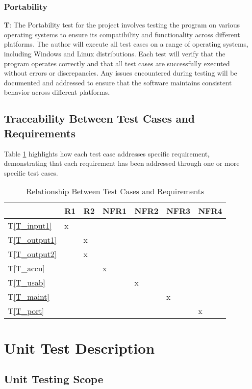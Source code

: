 \documentclass[12pt, titlepage]{article}
\newcounter{testCase}
\newcommand{\testCaseFormat}{T\thetestCase}
\newcommand{\tref}[1]{T\ref{#1}}
\begin{document}
\subsubsection{Portability}\label{subsec:Portability}
 \textbf{\testCaseFormat \label{T_port}}: The Portability test for the project involves testing the program on various operating systems to ensure its compatibility and functionality across different platforms. The author will execute all test cases on a range of operating systems, including Windows and Linux distributions. Each test will verify that the program operates correctly and that all test cases are successfully executed without errors or discrepancies. Any issues encountered during testing will be documented and addressed to ensure that the software maintains consistent behavior across different platforms. 

\subsection{Traceability Between Test Cases and Requirements}
Table \ref{tab:traceability} highlights how each test case addresses specific requirement, demonstrating that each requirement has been addressed through one or more specific test cases.
\begin{table}[H]
\centering
\begin{tabular}{|l|l|l|l|l|l|l|}
\hline
& R1 & R2 & NFR1 & NFR2 & NFR3 & NFR4 \\ \hline
\tref{T_input1} & x & & & & & \\ \hline
\tref{T_output1} & & x & & & & \\ \hline
\tref{T_output2} & & x & & & & \\ \hline
\tref{T_accu} & & &x & & & \\ \hline
\tref{T_usab} & & & &x & & \\ \hline
\tref{T_maint} & & & & &x & \\ \hline
\tref{T_port} & & & & & &x \\ \hline
\end{tabular}
\caption{Relationship Between Test Cases and Requirements}
\label{tab:traceability}
\end{table}

\section{Unit Test Description}


\subsection{Unit Testing Scope}
\end{document}
